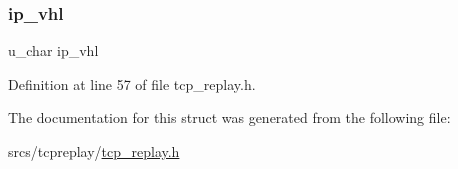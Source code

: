 \subsubsection{\texorpdfstring{ip\+\_\+vhl}{ip\_vhl}}
{\footnotesize\ttfamily u\+\_\+char ip\+\_\+vhl}



Definition at line 57 of file tcp\+\_\+replay.\+h.



The documentation for this struct was generated from the following file\+:\begin{DoxyCompactItemize}
\item 
srcs/tcpreplay/\hyperlink{tcp__replay_8h}{tcp\+\_\+replay.\+h}\end{DoxyCompactItemize}
